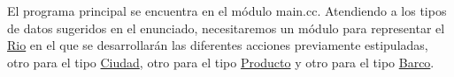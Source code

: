 El programa principal se encuentra en el módulo main.\+cc. Atendiendo a los tipos de datos sugeridos en el enunciado, necesitaremos un módulo para representar el \mbox{\hyperlink{classRio}{Rio}} en el que se desarrollarán las diferentes acciones previamente estipuladas, otro para el tipo \mbox{\hyperlink{classCiudad}{Ciudad}}, otro para el tipo \mbox{\hyperlink{classProducto}{Producto}} y otro para el tipo \mbox{\hyperlink{classBarco}{Barco}}. 